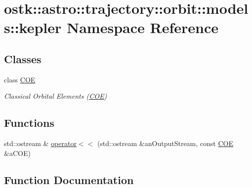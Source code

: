 \hypertarget{namespaceostk_1_1astro_1_1trajectory_1_1orbit_1_1models_1_1kepler}{}\section{ostk\+:\+:astro\+:\+:trajectory\+:\+:orbit\+:\+:models\+:\+:kepler Namespace Reference}
\label{namespaceostk_1_1astro_1_1trajectory_1_1orbit_1_1models_1_1kepler}
\subsection*{Classes}
\begin{DoxyCompactItemize}
\item 
class \hyperlink{classostk_1_1astro_1_1trajectory_1_1orbit_1_1models_1_1kepler_1_1_c_o_e}{C\+OE}
\begin{DoxyCompactList}\small\item\em Classical Orbital Elements (\hyperlink{classostk_1_1astro_1_1trajectory_1_1orbit_1_1models_1_1kepler_1_1_c_o_e}{C\+OE}) \end{DoxyCompactList}\end{DoxyCompactItemize}
\subsection*{Functions}
\begin{DoxyCompactItemize}
\item 
std\+::ostream \& \hyperlink{namespaceostk_1_1astro_1_1trajectory_1_1orbit_1_1models_1_1kepler_a1c001113578333c1fb99c4cf329215d3}{operator$<$$<$} (std\+::ostream \&an\+Output\+Stream, const \hyperlink{classostk_1_1astro_1_1trajectory_1_1orbit_1_1models_1_1kepler_1_1_c_o_e}{C\+OE} \&a\+C\+OE)
\end{DoxyCompactItemize}


\subsection{Function Documentation}
\mbox{\label{namespaceostk_1_1astro_1_1trajectory_1_1orbit_1_1models_1_1kepler_a1c001113578333c1fb99c4cf329215d3}} 

